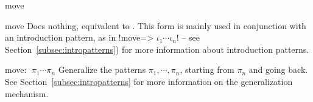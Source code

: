 \begin{tactic}{move}
  \begin{tsyntax}{move}
     Does nothing, equivalent to . This form is mainly
     used in conjunction with an introduction pattern, as in
     \ls!move=> $\iota_1 \cdots \iota_n$! -- see Section~\ref{subsec:intropatterns})
     for more information about introduction patterns.
  \end{tsyntax}

  \begin{tsyntax}{move: $\;\pi_1 \cdots \pi_n$}
    Generalize the patterns $\pi_1, \cdots, \pi_n$, starting from
    $\pi_n$ and going back. See Section~\ref{subsec:intropatterns} for more
    information on the generalization mechanism.
  \end{tsyntax}
\end{tactic}
